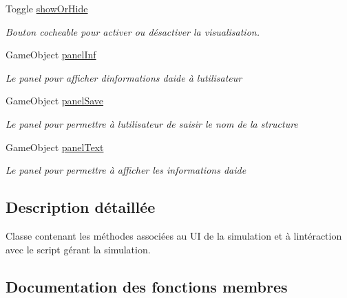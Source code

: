 \begin{DoxyCompactItemize}
Toggle \mbox{\hyperlink{class_menu_visualization_u_i_a76465e77e095aa0edd97d7dba183402e}{show\+Or\+Hide}}
\begin{DoxyCompactList}\small\item\em Bouton cocheable pour activer ou désactiver la visualisation. \end{DoxyCompactList}\item 
Game\+Object \mbox{\hyperlink{class_menu_visualization_u_i_ac04938fb4312a4f1c2f920a3eb4f7724}{panel\+Inf}}
\begin{DoxyCompactList}\small\item\em Le panel pour afficher d\textquotesingle{}informations d\textquotesingle{}aide à l\textquotesingle{}utilisateur \end{DoxyCompactList}\item 
Game\+Object \mbox{\hyperlink{class_menu_visualization_u_i_af538de452b7ce9bd31c5b61a3c3d0886}{panel\+Save}}
\begin{DoxyCompactList}\small\item\em Le panel pour permettre à l\textquotesingle{}utilisateur de saisir le nom de la structure \end{DoxyCompactList}\item 
Game\+Object \mbox{\hyperlink{class_menu_visualization_u_i_afb3f0b8c1a97e54dc40514db77041fcf}{panel\+Text}}
\begin{DoxyCompactList}\small\item\em Le panel pour permettre à afficher les informations d\textquotesingle{}aide \end{DoxyCompactList}\end{DoxyCompactItemize}


\subsection{Description détaillée}
Classe contenant les méthodes associées au UI de la simulation et à l\textquotesingle{}intéraction avec le script gérant la simulation. 



\subsection{Documentation des fonctions membres}
\mbox{\label{class_menu_visualization_u_i_abae4f4813543053bd5fc9d68ed4916d5}} 
